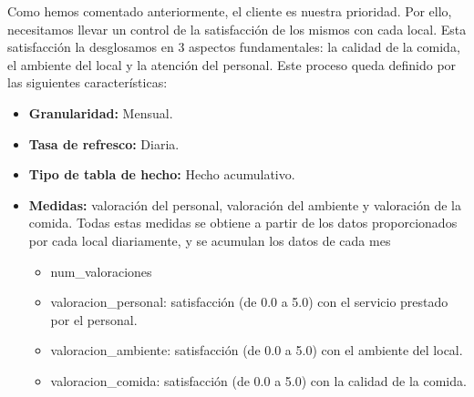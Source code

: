 \documentclass[12pt]{opticajnl}
\begin{document}
Como hemos comentado anteriormente, el cliente es nuestra prioridad. Por ello, necesitamos llevar un control de la satisfacción de los mismos con cada local. Esta satisfacción la desglosamos en 3 aspectos fundamentales: la calidad de la comida, el ambiente del local y la atención del personal. Este proceso queda definido por las siguientes características:
\begin{itemize}
\item \textbf{Granularidad:} Mensual.
\item \textbf{Tasa de refresco:} Diaria.
\item \textbf{Tipo de tabla de hecho:} Hecho acumulativo.
\item \textbf{Medidas:} valoración del personal, valoración del ambiente y valoración de la comida. Todas estas medidas se obtiene a partir de los datos proporcionados por cada local diariamente, y se acumulan los datos de cada mes
\begin{itemize}
\item num\_valoraciones
\item valoracion\_personal: satisfacción (de 0.0 a 5.0) con el servicio prestado por el personal.
\item valoracion\_ambiente: satisfacción (de 0.0 a 5.0) con el ambiente del local.
\item valoracion\_comida: satisfacción (de 0.0 a 5.0) con la calidad de la comida.
\end{itemize}
\end{itemize}
\end{document}
